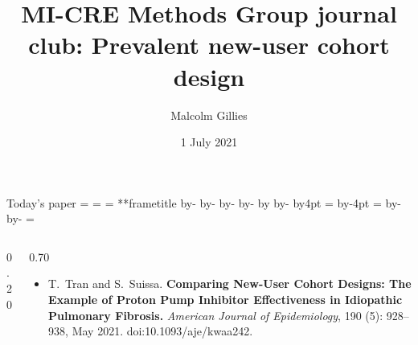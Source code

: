 \documentclass[aspectratio=169,12pt]{beamer} %
\title{MI-CRE Methods Group journal club: Prevalent new-user cohort design}
\author{Malcolm Gillies}
\institute{\url{https://github.com/mbg-unsw/pnuc}}
\date{1 July 2021}
\makeatletter
\newif\ifsidebartheme
\newcommand*{\calculatespace}{%
    \contentheight=\paperheight%
    \ifx\beamer@frametitle\@empty%
        \setbox\@tempboxa=\box\voidb@x%
      \else%
        \setbox\@tempboxa=\vbox{%
          \vbox{}%
          {\parskip0pt\usebeamertemplate***{frametitle}}%
        }%
        \ifsidebartheme%
          \advance\contentheight by-1em%
        \fi%
      \fi%
    \advance\contentheight by-\ht\@tempboxa%
    \advance\contentheight by-\dp\@tempboxa%
    \advance\contentheight by-\beamer@frametopskip%
    \ifbeamer@plainframe%
    \contentbottom=0pt%
    \else%
    \advance\contentheight by-\headheight%
    \advance\contentheight by\headdp%
    \advance\contentheight by-\footheight%
    \advance\contentheight by4pt%
    \contentbottom=\footheight%
    \advance\contentbottom by-4pt%
    \fi%
    \contentwidth=\paperwidth%
    \ifbeamer@plainframe%
    \contentleft=0pt%
    \else%
    \advance\contentwidth by-\beamer@rightsidebar%
    \advance\contentwidth by-\beamer@leftsidebar\relax%
    \contentleft=\beamer@leftsidebar%
    \fi%
}
\makeatother
\begin{document}
{
\begin{frame}
\titlepage
\end{frame}
}

\begin{frame}{Today's paper}
\calculatespace%
\begin{columns}
\begin{column}{0.20\contentwidth}
\end{column}
\begin{column}{0.70\contentwidth}
	\begin{itemize}
		\item T.~Tran and S.~Suissa. \textbf{Comparing {New}-{User} {Cohort} {Designs}: {The} {Example} of {Proton} {Pump} {Inhibitor} {Effectiveness} in {Idiopathic} {Pulmonary} {Fibrosis}.} \emph{American Journal of Epidemiology}, 190 (5): 928--938, May 2021. doi:10.1093/aje/kwaa242.
\nocite{tran_comparing_2021}
	\end{itemize}
\end{column}
\end{columns}
\end{frame}
\end{document}
